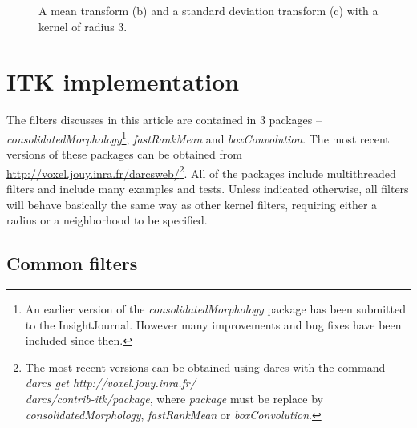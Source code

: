 \documentclass{InsightArticle}
\begin{document}
\begin{figure}[htbp]
\begin{center}
\caption{A mean transform (b) and a standard deviation transform (c) with a kernel of radius 3.}
\end{center}
\end{figure}


\section{ITK implementation}
The filters discusses in this article are contained in 3 packages --
{\em consolidatedMorphology}\footnote{An earlier version of the {\em consolidatedMorphology} package has
been submitted to the InsightJournal. However many improvements and
bug fixes have been included since then.}, {\em fastRankMean} and {\em
boxConvolution}. The most recent versions of these packages can be
obtained from \url{http://voxel.jouy.inra.fr/darcsweb/}\footnote{
The most recent versions can be obtained using darcs \cite{DarcsWebSite}
with the command {\em darcs get http://voxel.jouy.inra.fr/\\darcs/contrib-itk/package},
where {\em package} must be replace by {\em consolidatedMorphology},
{\em fastRankMean} or {\em boxConvolution}.}.
All of the packages
include multithreaded filters and include many examples and tests. Unless
indicated otherwise, all filters will behave basically the same way as
other kernel filters, requiring either a radius or a neighborhood to
be specified.

\subsection{Common filters}
\end{document}
